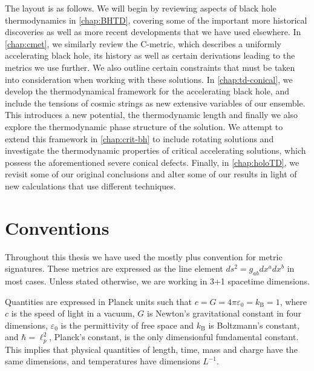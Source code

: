 \documentclass[
twoside,
openright,
frontopenright,
]{dmathesis}
\begin{document}
The layout is as follows. We will begin by reviewing aspects of black hole
thermodynamics in \cref{chap:BHTD}, covering some of the important more
historical discoveries as well as more recent developments that we have used
elsewhere. In \cref{chap:cmet}, we similarly review the C-metric, which
describes a uniformly accelerating black hole, its history as well as certain
derivations leading to the metrics we use further. We also outline certain
constraints that must be taken into consideration when working with these
solutions. In \cref{chap:td-conical}, we develop the thermodynamical framework
for the accelerating black hole, and include the tensions of cosmic strings as
new extensive variables of our ensemble. This introduces a new potential, the
thermodynamic length and finally we also explore the thermodynamic phase
structure of the solution. We attempt to extend this framework in
\cref{chap:crit-bh} to include rotating solutions and investigate the
thermodynamic properties of critical accelerating solutions, which possess the
aforementioned severe conical defects. Finally, in \cref{chap:holoTD}, we
revisit some of our original conclusions and alter some of our results in light
of new calculations that use different techniques.

\section*{Conventions}
 Throughout this thesis we have used
the mostly plus convention for metric signatures. These metrics are expressed as
the line element $ds^2 = g_{ab}dx^adx^b$ in most cases. Unless stated otherwise,
we are working in 3+1 spacetime dimensions.

Quantities are expressed in Planck units such that
$c = G = 4\pi\varepsilon_0 = k_\mathrm{B} = 1$, where $c$ is the speed of light
in a vacuum, $G$ is Newton's gravitational constant in four dimensions,
$\varepsilon_0$ is the permittivity of free space and $k_\mathrm{B}$ is
Boltzmann's constant, and $\hbar = \ell_p^2$, Planck's constant, is the only
dimensionful fundamental constant. This implies that physical quantities of
length, time, mass and charge have the same dimensions, and temperatures have
dimensions $L^{-1}$.
\end{document}
